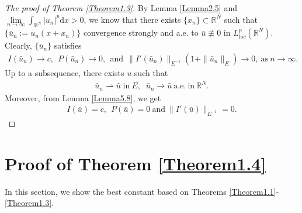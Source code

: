 \documentclass[12pt,a4paper,reqno]{amsart}
\numberwithin{equation}{section}
\begin{document}
\begin{proof}[The proof of Theorem \ref{Theorem1.3}]
By Lemma \ref{Lemma2.5} and $\lim\limits_{n\to\infty}\int_{\mathbb{R}^{N}}
|u_{n}|^{p}
\mathrm{d}x>0$,
we know that there exists $\{x_{n}\}\subset \mathbb{R}^{N}$ such that $\{\bar{u}_{n}:=u_{n}(x+x_{n})\}$ convergence strongly and a.e. to $\bar{u}\not\equiv0$ in $L^{p}_{loc}(\mathbb{R}^{N})$.
Clearly, $\{\bar{u}_{n}\}$ satisfies
\begin{equation*}
\begin{aligned}
I(\bar{u}_{n})\to c,~~
P(\bar{u}_{n})\to 0,~~\mathrm{and}~~ \|I'(\bar{u}_{n})\|_{E^{-1}}(1+\|\bar{u}_{n}\|_{E})\to 0,\ \mathrm{as}\ n\rightarrow \infty.
\end{aligned}
\end{equation*}
Up to a subsequence,
there exists
$u$
such that
\begin{equation*}
\begin{aligned}
\bar{u}_{n}\rightharpoonup \bar{u}
\;
\mathrm{in}
~
E,
\;\;
\bar{u}_{n}\rightarrow \bar{u}
~
\mathrm{a.e. ~in}
~
\mathbb{R}^{N}.
\end{aligned}
\end{equation*}
Moreover, from Lemma \ref{Lemma5.8}, we get
\begin{equation*}
\begin{aligned}
I(\bar{u})=c,~~P(\bar{u})=0~\mathrm{and}~\|I'(\bar{u})\|_{E^{-1}}=0.
\end{aligned}
\end{equation*}
\end{proof}


\section{Proof of Theorem \ref{Theorem1.4}}
In this section, we show the best constant based on Theorems \ref{Theorem1.1}-\ref{Theorem1.3}.
\end{document}
